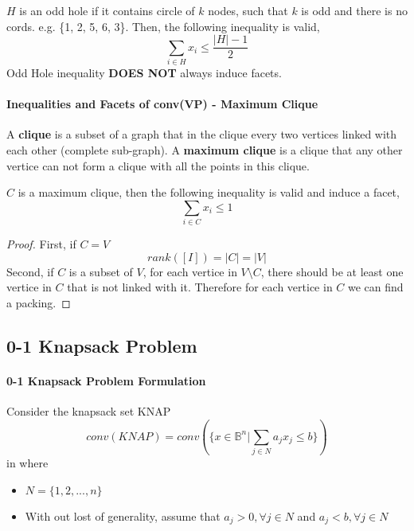                     $H$ is an odd hole if it contains circle of $k$ nodes, such that $k$ is odd and there is no cords. e.g. \{1, 2, 5, 6, 3\}. Then, the following inequality is valid,
                    \begin{equation*}
                        \sum_{i\in H}x_i\le \frac{|H|-1}2 \nonumber
                    \end{equation*}
                    Odd Hole inequality \textbf{DOES NOT} always induce facets.

                \paragraph{Inequalities and Facets of conv(VP) - Maximum Clique}
                    A \textbf{clique} is a subset of a graph that in the clique every two vertices linked with each other (complete sub-graph). A \textbf{maximum clique} is a clique that any other vertice can not form a clique with all the points in this clique.

                    $C$ is a maximum clique, then the following inequality is valid and induce a facet,
                    \begin{equation*}
                        \sum_{i\in C} x_i \le 1 \nonumber
                    \end{equation*}
                    
                    \begin{proof}
                        First, if $C=V$
                        \begin{equation*}
                            rank\left(\left[I\right]\right) = |C| = |V| \nonumber           
                        \end{equation*}
                        Second, if $C$ is a subset of $V$, for each vertice in $V \setminus C$, there should be at least one vertice in $C$ that is not linked with it. Therefore for each vertice in $C$ we can find a packing.
                    \end{proof}                    

            \subsection{0-1 Knapsack Problem}
                \paragraph{0-1 Knapsack Problem Formulation}
                    Consider the knapsack set KNAP
                    \begin{equation*}conv(KNAP)= conv(\{x\in \mathbb{B}^n|\sum_{j\in N}a_jx_j\le b\})\end{equation*}
                    in where
                    \begin{itemize}
                        \item $N = \{1, 2, ..., n\}$
                        \item With out lost of generality, assume that $a_j > 0, \forall j \in N$ and $a_j < b, \forall j \in N$
                    \end{itemize}

